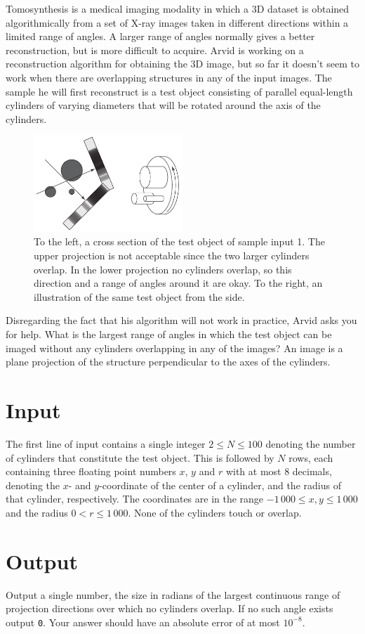 
\noindent
Tomosynthesis is a medical imaging modality in which a 3D dataset is obtained algorithmically from a set of X-ray images taken in different directions within a limited range of angles. A larger range of angles normally gives a better reconstruction, but is more difficult to acquire. Arvid is working on a reconstruction algorithm for obtaining the 3D image, but so far it doesn’t seem to work when there are overlapping structures in any of the input images. The sample he will first reconstruct is a test object consisting of parallel equal-length cylinders of varying diameters that will be rotated around the axis of the cylinders. 

\begin{figure}[h]
    \begin{center}
    \includegraphics[width=0.5\textwidth]{phantom}
    \caption{To the left, a cross section of the test object of sample input 1. The upper projection is not acceptable since the two larger cylinders overlap. In the lower projection no cylinders overlap, so this direction and a range of angles around it are okay. To the right, an illustration of the same test object from the side.}
    \end{center}
\end{figure}

Disregarding the fact that his algorithm will not work in practice, Arvid asks you for help. What is the largest range of angles in which the test object can be imaged without any cylinders overlapping in any of the images? An image is a plane projection of the structure perpendicular to the axes of the cylinders.

\section*{Input}
The first line of input contains a single integer $2\leq N\leq 100$ denoting the number of cylinders
that constitute the test object. This is followed by $N$ rows, each containing three floating point
numbers $x$, $y$ and $r$ with at most $8$ decimals, denoting the $x$- and $y$-coordinate of the center of a cylinder, and the
radius of that cylinder, respectively. The coordinates are in the range $-1\,000\leq x,y \leq
1\,000$ and the radius $0<r\leq 1\,000$. None of the cylinders touch or overlap.

\section*{Output}
Output a single number, the size in radians of the largest continuous range of projection directions
over which no cylinders overlap. If no such angle exists output \verb|0|. Your answer should have an
absolute error of at most $10^{-8}$.

